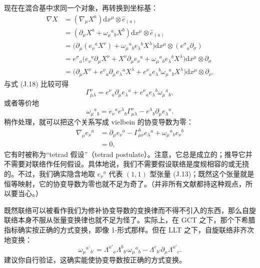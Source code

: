 现在在混合基中求同一个对象，再转换到坐标基：
\begin{align*}
\nabla X &= (\nabla_{\mu}X^{a})\mathrm{d}x^{\mu}\otimes\hat{e}_{(a)} \\
&= (\partial_{\mu}X^{a} + \omega_{\mu}{}^{a}{}_{b}X^{b})\mathrm{d}x^{\mu}\otimes\hat{e}_{(a)} \\
&= \big(\partial_{\mu}(e_{\nu}{}^{a}X^{\nu}) + \omega_{\mu}{}^{a}{}_{b}e_{\lambda}{}^{b}X^{\lambda}\big)\mathrm{d}x^{\mu}\otimes(e^{\sigma}{}_{a}\partial_{\sigma}) \\
&= e^{\sigma}{}_{a}\big(e_{\nu}{}^{a}\partial_{\mu}X^{\nu} + X^{\nu}\partial_{\mu}e_{\nu}{}^{a} + \omega_{\mu}{}^{a}{}_{b}e_{\lambda}{}^{b}X^{\lambda}\big)\mathrm{d}x^{\mu}\otimes\partial_{\sigma} \\
&= \big(\partial_{\mu}X^{\nu} + e^{\nu}{}_{a}\partial_{\mu}e_{\lambda}{}^{a}X^{\lambda} + e^{\nu}{}_{a}e_{\lambda}{}^{b}\omega_{\mu}{}^{a}{}_{b}X^{\lambda}\big)\mathrm{d}x^{\mu}\otimes\partial_{\nu}. \tag{J.19}
\end{align*}
与式 (J.18) 比较可得
\begin{equation*}
\Gamma^{\nu}_{\mu\lambda} = e^{\nu}{}_{a}\partial_{\mu}e_{\lambda}{}^{a} + e^{\nu}{}_{a}e_{\lambda}{}^{b}\omega_{\mu}{}^{a}{}_{b},
\tag{J.20}
\end{equation*}
或者等价地
\begin{equation*}
\omega_{\mu}{}^{a}{}_{b} = e_{\nu}{}^{a}e^{\lambda}{}_{b}\Gamma^{\nu}_{\mu\lambda} - e^{\lambda}{}_{b}\partial_{\mu}e_{\lambda}{}^{a}.
\tag{J.21}
\end{equation*}
稍作处理，就可以把这个关系写成 vielbein 的协变导数为零：
\begin{align*}
\nabla_{\mu}e_{\nu}{}^{a} &= \partial_{\mu}e_{\nu}{}^{a} - \Gamma^{\lambda}_{\mu\nu}e_{\lambda}{}^{a} + \omega_{\mu}{}^{a}{}_{b}e_{\nu}{}^{b} \\
&= 0, \tag{J.22}
\end{align*}
它有时被称为“tetrad 假设”（tetrad postulate）。注意，它总是成立的；推导它并不需要对联络作任何假设。具体地说，我们不需要假设联络是度规相容的或无挠的。不过，我们确实隐含地取 $e_{\nu}{}^{a}$ 代表 $(1,1)$ 型张量 (J.13)；既然这个张量就是恒等映射，它的协变导数为零也就不足为奇了。（并非所有文献都持这种观点，所以要当心。）

既然联络可以被看作我们为修补协变导数的变换律而不得不引入的东西，那么自旋联络本身不服从张量变换律也就不足为怪了。实际上，在 GCT 之下，那个下希腊指标确实按正确的方式变换，即像 1-形式那样。但在 LLT 之下，自旋联络非齐次地变换：
\begin{equation*}
\omega_{\mu}{}^{a'}{}_{b'} = \Lambda^{a'}{}_{a}\Lambda^{b}{}_{b'}\omega_{\mu}{}^{a}{}_{b} - \Lambda^{c}{}_{b'}\partial_{\mu}\Lambda^{a'}{}_{c}.
\tag{J.23}
\end{equation*}
建议你自行验证，这确实能使协变导数按正确的方式变换。

